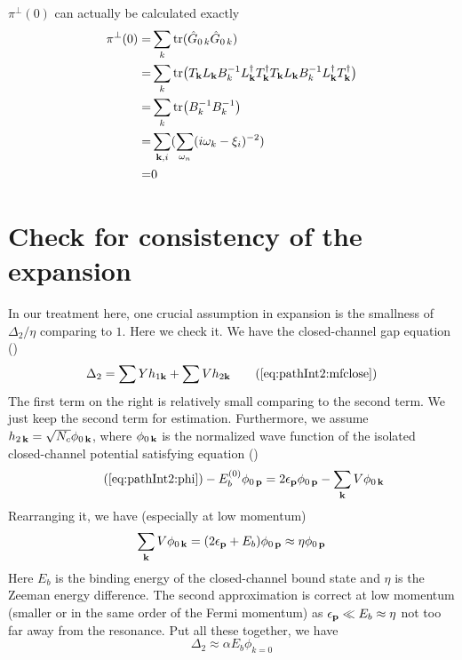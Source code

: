 $\pi^{\perp}(0)$ can actually be calculated   exactly
\begin{equation}
\begin{split}
\pi^{\perp}(0)=&\sum_k\text{tr}(\hat{G}_{0\,k}\hat{G}_{0\,k})\\
	=&\sum_k\text{tr}\big(T_{\mathbf{k}}L_{\mathbf{k}}B_{k}^{-1}L_{\mathbf{k}}^{\dagger}T_{\mathbf{k}}^{\dagger}T_{\mathbf{k}}L_{\mathbf{k}}B_{k}^{-1}L_{\mathbf{k}}^{\dagger}T_{\mathbf{k}}^{\dagger}\big)\\
	=&\sum_k\text{tr}\big(B_{k}^{-1}B_{k}^{-1}\big)\\
	=&\sum_{\mathbf{k},i}(\sum_{\omega_{n}}(i\omega_{k}-\xi_{i})^{-2})\\
	=&0
\end{split}
\end{equation}


\section{Check for consistency of the expansion\label{sec:pathApp:consistency}}
In our treatment here, one crucial assumption in expansion is the smallness of $\Delta_{2}/\eta$ comparing to $1$.  Here we check it.  We have the closed-channel gap equation ()
\begin{equation}
\Delta_{2}=\sum{}Yh_{1\vk}+\sum{}Vh_{2\vk}\tag{\ref{eq:pathInt2:mfclose}}
\end{equation}
The first term on the right is relatively small comparing to the second term.  We just keep the second term for estimation.  Furthermore,  we assume $h_{2\,\mathbf{k}}=\sqrt{N_{c}}\phi_{0\,\mathbf{k}}$, where $\phi_{0\,\mathbf{k}}$ is the normalized wave function of the  isolated closed-channel potential satisfying \sch equation ()
\begin{equation}\tag{\ref{eq:pathInt2:phi}}
-E_{b}^{(0)}\phi_{0\,\vp}=2\epsilon_{\vp}\phi_{0\,\vp}-\sum_{\vk}V \phi_{0\,\vk}
\end{equation}
Rearranging it, we have (especially at low momentum)
\begin{equation*}
\sum_{\mathbf{k}}V \phi_{0\,\mathbf{k}}=(2\epsilon_{\mathbf{p}}+E_{b})\phi_{0\,\mathbf{p}}\approx{\eta}\phi_{0\,\mathbf{p}}
\end{equation*}
Here $E_{b}$ is the binding energy of the closed-channel bound state and $\eta$ is the Zeeman energy difference. The second approximation is correct at low momentum (smaller or in the same order of the Fermi momentum) as $\epsilon_{\mathbf{p}}\ll{}E_{b}\approx\eta$ not too far away from the resonance.  Put all these together, we have
\begin{equation*}
\Delta_{2}\approx\alpha{}E_{b}\phi_{k=0}
\end{equation*}
